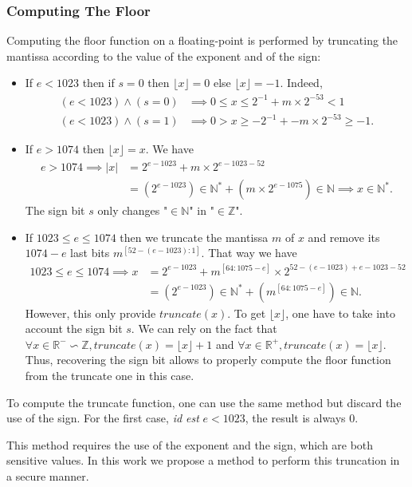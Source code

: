 \documentclass[runningheads]{llncs}
\begin{document}
\subsubsection{Computing The Floor}\label{sec:computefloor}
Computing the floor function on a floating-point is performed by truncating the
mantissa according to the value of the exponent and of the
sign:
\begin{itemize}
  \item If $e<1023$ then if $s=0$ then $\lfloor x \rfloor = 0$ else $\lfloor x \rfloor = -1$. Indeed,\begin{align}
    (e<1023)\wedge(s=0) &\implies 0\leq x \leq  2^{-1} + m\times2^{-53} < 1 \\
    (e<1023)\wedge(s=1) &\implies 0 > x \geq -2^{-1} + -m\times2^{-53} \geq -1.
  \end{align}
  \item If $e>1074$ then $\lfloor x \rfloor = x$. We have \begin{align}
    e>1074 \implies |x| &= 2^{e-1023} + m\times2^{e-1023-52} \\ &= (2^{e-1023})\in\mathbb{N}^* + (m\times2^{e-1075})\in\mathbb{N} \implies x\in\mathbb{N}^*.
  \end{align}
  The sign bit $s$ only changes "$\in\mathbb{N}$" in "$\in\mathbb{Z}$".
  \item If $1023\leq e \leq 1074$ then we truncate the mantissa $m$ of $x$ and remove its $1074-e$ last bits $m^{[52-(e-1023):1]}$. That way we have \begin{align}
    1023\leq e \leq 1074 \implies x&= 2^{e-1023} + m^{[64:1075-e]}\times 2^{52-(e-1023)+e-1023-52} \\
    &= (2^{e-1023})\in\mathbb{N}^* + (m^{[64:1075-e]})\in\mathbb{N}.
  \end{align}
  However, this only provide $truncate(x)$. To get $\lfloor x \rfloor$, one have to take into account the sign bit $s$. We can rely on the fact that $\forall x\in\mathbb{R}^-\backsim\mathbb{Z}, truncate(x) = \lfloor x \rfloor +1$ and $\forall x \in\mathbb{R}^+, truncate(x) = \lfloor x \rfloor$. Thus, recovering the sign bit allows to properly compute the floor function from the truncate one in this case.
\end{itemize}
\begin{remark}
  To compute the truncate function, one can use the same method but discard the use of the sign. For the first case, \emph{id est} $e<1023$, the result is always $0$.
\end{remark}
This method requires
the use of the exponent and the sign, which are both sensitive values. In this work we propose a method to
perform this truncation in a secure manner.
\end{document}
